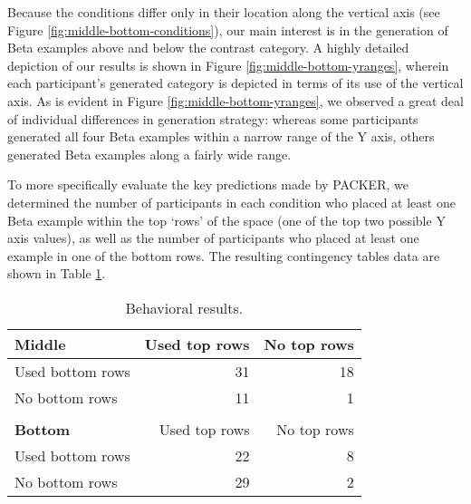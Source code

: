 \documentclass[10pt,letterpaper]{article}
\begin{document}
Because the conditions differ only in their location along the vertical axis (see Figure \ref{fig:middle-bottom-conditions}), our main interest is in the generation of Beta examples above and below the contrast category. A highly detailed depiction of our results is shown in Figure \ref{fig:middle-bottom-yranges}, wherein each participant's generated category is depicted in terms of its use of the vertical axis. As is evident in Figure \ref{fig:middle-bottom-yranges}, we observed a great deal of individual differences in generation strategy: whereas some participants generated all four Beta examples within a narrow range of the Y axis, others generated Beta examples along a fairly wide range. 

\begin{figure*}
    \begin{center}
    
    \caption{Behavioral results. Each line shows the minimum and maximum value of a generated category along the Y (vertical) axis. Dots along each line represent the positions of individual exemplars in the category, and each participant's category is shown on a separate line. Participants are sorted by overall Y axis range, and then by condition.}
    \label{fig:middle-bottom-yranges}
    \end{center}
\end{figure*}

To more specifically evaluate the key predictions made by PACKER, we determined the number of participants in each condition who placed at least one Beta example within the top `rows' of the space (one of the top two possible Y axis values), as well as the number of participants who placed at least one example in one of the bottom rows. The resulting contingency tables data are shown in Table \ref{table:subset-table}.

\begin{table}
\begin{center} 
\caption{Behavioral results.} 
\label{table:subset-table} 
\vskip 0.12in
\begin{tabular}{ l r r}
    \textbf{Middle}         & Used top rows & No top rows \\
    \hline
    Used bottom rows        &  31 & 18  \\
    No bottom rows          &  11 &  1  \\
    \\
    \textbf{Bottom}         & Used top rows & No top rows \\
    \hline
    Used bottom rows        & 22 & 8 \\
    No bottom rows          & 29 & 2 \\
\end{tabular}
\end{center} 
\end{table}
\end{document}

